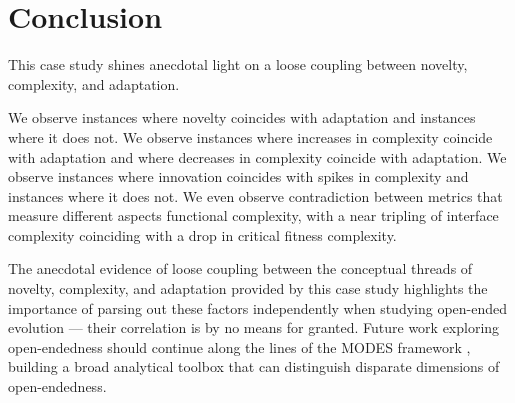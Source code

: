 \section{Conclusion}

This case study shines anecdotal light on a loose coupling between novelty, complexity, and adaptation.

We observe instances where novelty coincides with adaptation and instances where it does not. We observe instances where increases in complexity coincide with adaptation and where decreases in complexity coincide with adaptation. We observe instances where innovation coincides with spikes in complexity and instances where it does not. We even observe contradiction between metrics that measure different aspects functional complexity, with a near tripling of interface complexity coinciding with a drop in critical fitness complexity.

The anecdotal evidence of loose coupling between the conceptual threads of novelty, complexity, and adaptation provided by this case study highlights the importance of parsing out these factors independently when studying open-ended evolution --- their  correlation is by no means for granted.
Future work exploring open-endedness should continue along the lines of the MODES framework \citep{dolson2019modes}, building a broad analytical toolbox that can distinguish disparate dimensions of open-endedness.








